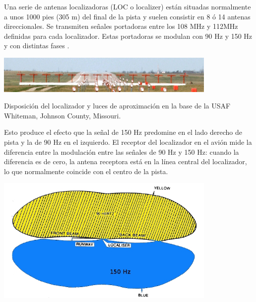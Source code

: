 \documentclass[10pt]{beamer}
\begin{document}
\begin{frame}
Una serie de antenas localizadoras (LOC o localizer) están situadas normalmente a unos 1000 pies (305 m) del final de la pista y suelen consistir en 8 ó 14 antenas direccionales. Se transmiten señales portadoras entre los 108 MHz y 112MHz definidas para cada localizador. Estas portadoras se modulan con 90 Hz y 150 Hz y con distintas fases .

\begin{center}
  \includegraphics[width=0.8\textwidth]{imagenes/Whiteman_localizer.eps}

   {\small Disposición del localizador y luces de
    aproximación en la base de la USAF Whiteman, Johnson County,
    Missouri.}
\end{center}

\end{frame}

\begin{frame}
  Esto produce el efecto que la señal de 150 Hz predomine en el lado derecho de pista y la de 90 Hz en el izquierdo. El receptor del localizador en el avión mide la diferencia entre la modulación entre las señales de 90 Hz y 150 Hz: cuando la diferencia es de cero, la antena receptora está en la línea central del localizador, lo que normalmente coincide con el centro de la pista.


\begin{center}
  \includegraphics[width=0.8\textwidth]{imagenes/localizer-color.jpg}

\end{center}

\end{frame}
\end{document}
